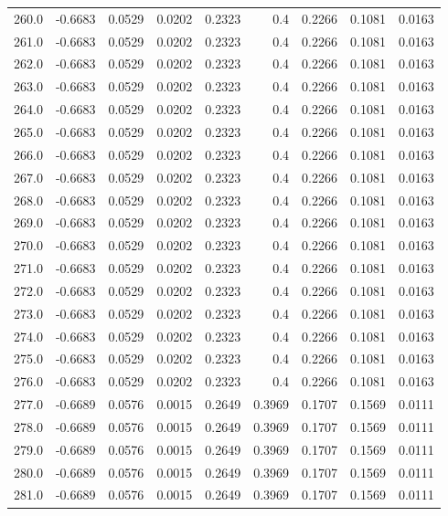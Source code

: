\begin{longtable}{lrrrrrrrr}
260.0 & -0.6683 & 0.0529 & 0.0202 & 0.2323 & 0.4 & 0.2266 & 0.1081 & 0.0163 \\
261.0 & -0.6683 & 0.0529 & 0.0202 & 0.2323 & 0.4 & 0.2266 & 0.1081 & 0.0163 \\
262.0 & -0.6683 & 0.0529 & 0.0202 & 0.2323 & 0.4 & 0.2266 & 0.1081 & 0.0163 \\
263.0 & -0.6683 & 0.0529 & 0.0202 & 0.2323 & 0.4 & 0.2266 & 0.1081 & 0.0163 \\
264.0 & -0.6683 & 0.0529 & 0.0202 & 0.2323 & 0.4 & 0.2266 & 0.1081 & 0.0163 \\
265.0 & -0.6683 & 0.0529 & 0.0202 & 0.2323 & 0.4 & 0.2266 & 0.1081 & 0.0163 \\
266.0 & -0.6683 & 0.0529 & 0.0202 & 0.2323 & 0.4 & 0.2266 & 0.1081 & 0.0163 \\
267.0 & -0.6683 & 0.0529 & 0.0202 & 0.2323 & 0.4 & 0.2266 & 0.1081 & 0.0163 \\
268.0 & -0.6683 & 0.0529 & 0.0202 & 0.2323 & 0.4 & 0.2266 & 0.1081 & 0.0163 \\
269.0 & -0.6683 & 0.0529 & 0.0202 & 0.2323 & 0.4 & 0.2266 & 0.1081 & 0.0163 \\
270.0 & -0.6683 & 0.0529 & 0.0202 & 0.2323 & 0.4 & 0.2266 & 0.1081 & 0.0163 \\
271.0 & -0.6683 & 0.0529 & 0.0202 & 0.2323 & 0.4 & 0.2266 & 0.1081 & 0.0163 \\
272.0 & -0.6683 & 0.0529 & 0.0202 & 0.2323 & 0.4 & 0.2266 & 0.1081 & 0.0163 \\
273.0 & -0.6683 & 0.0529 & 0.0202 & 0.2323 & 0.4 & 0.2266 & 0.1081 & 0.0163 \\
274.0 & -0.6683 & 0.0529 & 0.0202 & 0.2323 & 0.4 & 0.2266 & 0.1081 & 0.0163 \\
275.0 & -0.6683 & 0.0529 & 0.0202 & 0.2323 & 0.4 & 0.2266 & 0.1081 & 0.0163 \\
276.0 & -0.6683 & 0.0529 & 0.0202 & 0.2323 & 0.4 & 0.2266 & 0.1081 & 0.0163 \\
277.0 & -0.6689 & 0.0576 & 0.0015 & 0.2649 & 0.3969 & 0.1707 & 0.1569 & 0.0111 \\
278.0 & -0.6689 & 0.0576 & 0.0015 & 0.2649 & 0.3969 & 0.1707 & 0.1569 & 0.0111 \\
279.0 & -0.6689 & 0.0576 & 0.0015 & 0.2649 & 0.3969 & 0.1707 & 0.1569 & 0.0111 \\
280.0 & -0.6689 & 0.0576 & 0.0015 & 0.2649 & 0.3969 & 0.1707 & 0.1569 & 0.0111 \\
281.0 & -0.6689 & 0.0576 & 0.0015 & 0.2649 & 0.3969 & 0.1707 & 0.1569 & 0.0111 \\

\end{longtable}
